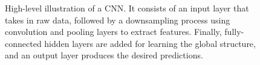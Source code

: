 \begin{figure}[ht]
    \caption[High-level CNN diagram.]{\small{High-level illustration of a CNN. It consists of an input layer that takes in raw data, followed by a downsampling process using convolution and pooling layers to extract features. Finally, fully-connected hidden layers are added for learning the global structure, and an output layer produces the desired predictions.}}
    \label{fig: CNN colour diagram}
\end{figure}